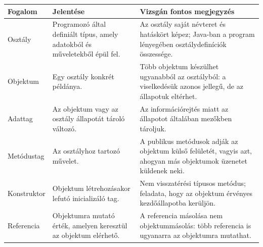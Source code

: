\begin{tabularx}{\textwidth}{L{31mm}X X}
\toprule
\textbf{Fogalom} & \textbf{Jelentése} & \textbf{Vizsgán fontos megjegyzés} \\
\midrule
Osztály & Programozó által definiált típus, amely adatokból és műveletekből épül fel. & Az osztály saját névteret és hatáskört képez; Java-ban a program lényegében osztálydefiníciók összessége. \\
Objektum & Egy osztály konkrét példánya. & Több objektum készülhet ugyanabból az osztályból: a viselkedésük azonos jellegű, de az állapotuk eltérhet. \\
Adattag & Az objektum vagy az osztály állapotát tároló változó. & Az információrejtés miatt az állapotot általában  mezőkben tároljuk. \\
Metódustag & Az osztályhoz tartozó művelet. & A publikus metódusok adják az objektum külső felületét, vagyis azt, ahogyan más objektumok üzenetet küldenek neki. \\
Konstruktor & Objektum létrehozásakor lefutó inicializáló tag. & Nem visszatérési típusos metódus; feladata, hogy az objektum érvényes kezdőállapotba kerüljön. \\
Referencia & Objektumra mutató érték, amelyen keresztül az objektum elérhető. & A referencia másolása nem objektummásolás: több referencia is ugyanarra az objektumra mutathat. \\
\bottomrule
\end{tabularx}
